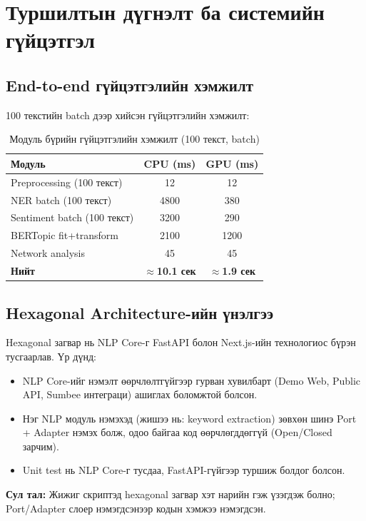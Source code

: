 \section{Туршилтын дүгнэлт ба системийн гүйцэтгэл}

\subsection{End-to-end гүйцэтгэлийн хэмжилт}

100 текстийн batch дээр хийсэн гүйцэтгэлийн хэмжилт:

\begin{table}[h!]
\centering
\renewcommand{\arraystretch}{1.4}
\begin{tabular}{|l|c|c|}
\hline
\textbf{Модуль} & \textbf{CPU (ms)} & \textbf{GPU (ms)} \\ \hline
Preprocessing (100 текст) & 12 & 12 \\ \hline
NER batch (100 текст) & 4800 & 380 \\ \hline
Sentiment batch (100 текст) & 3200 & 290 \\ \hline
BERTopic fit+transform & 2100 & 1200 \\ \hline
Network analysis & 45 & 45 \\ \hline
\textbf{Нийт} & \textbf{$\approx$10.1 сек} & \textbf{$\approx$1.9 сек} \\ \hline
\end{tabular}
\caption{Модуль бүрийн гүйцэтгэлийн хэмжилт (100 текст, batch)}
\label{tab:performance}
\end{table}

\subsection{Hexagonal Architecture-ийн үнэлгээ}

Hexagonal загвар нь NLP Core-г FastAPI болон Next.js-ийн технологиос бүрэн тусгаарлав. Үр дүнд:
\begin{itemize}
    \item NLP Core-ийг нэмэлт өөрчлөлтгүйгээр гурван хувилбарт (Demo Web, Public API, Sumbee интеграци) ашиглах боломжтой болсон.
    \item Нэг NLP модуль нэмэхэд (жишээ нь: keyword extraction) зөвхөн шинэ Port + Adapter нэмэх болж, одоо байгаа код өөрчлөгддөггүй (Open/Closed зарчим).
    \item Unit test нь NLP Core-г тусдаа, FastAPI-гүйгээр туршиж болдог болсон.
\end{itemize}

\textbf{Сул тал:} Жижиг скриптэд hexagonal загвар хэт нарийн гэж үзэгдэж болно; Port/Adapter слоер нэмэгдсэнээр кодын хэмжээ нэмэгдсэн.
